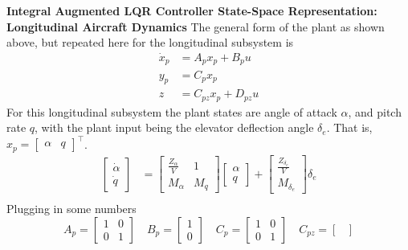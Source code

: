 \begin{example}
  \textbf{Integral Augmented LQR Controller State-Space Representation: Longitudinal Aircraft Dynamics}
  The general form of the plant as shown above, but repeated here for the longitudinal subsystem is
  \begin{align*}
    \dot{x}_{p}&=A_{p}x_{p}+B_{p}u \\
    y_{p}&=C_{p}x_{p} \\
    z&=C_{pz}x_{p}+D_{pz}u
  \end{align*}
  For this longitudinal subsystem the plant states are angle of attack $\alpha$, and pitch rate $q$, with the plant input being the elevator deflection angle $\delta_{e}$.
  That is, $x_{p}=\begin{bmatrix} \alpha & q \end{bmatrix}^{\top}$.
  \begin{align*}
    \begin{bmatrix}
      \dot{\alpha} \\
      \dot{q}
    \end{bmatrix}&=
    \begin{bmatrix}
      \frac{Z_{\alpha}}{V} & 1 \\
      M_{\alpha} & M_{q}
    \end{bmatrix}
    \begin{bmatrix}
      \alpha \\
      q
    \end{bmatrix}+
    \begin{bmatrix}
      \frac{Z_{\delta_{e}}}{V} \\
      M_{\delta_{e}}
    \end{bmatrix}\delta_{e} \\
  \end{align*}
  Plugging in some numbers
  \begin{equation*}
    A_{p}=
    \begin{bmatrix}
      1 & 0 \\
      0 & 1
    \end{bmatrix}
    \quad
    B_{p}=
    \begin{bmatrix}
      1 \\
      0
    \end{bmatrix}
    \quad
    C_{p}=
    \begin{bmatrix}
      1 & 0 \\
      0 & 1
    \end{bmatrix}
    \quad
    C_{pz}=
    \begin{bmatrix}

\end{bmatrix}
\end{equation*}
\end{example}

